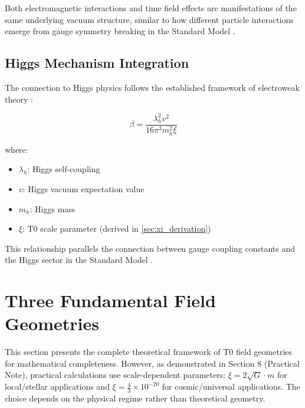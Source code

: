 \documentclass[12pt,a4paper]{article}
\begin{document}
	\begin{tcolorbox}[colback=blue!5!white,colframe=blue!75!black,title=Vacuum Structure Unity]
		Both electromagnetic interactions and time field effects are manifestations of the same underlying vacuum structure, similar to how different particle interactions emerge from gauge symmetry breaking in the Standard Model \citep{weinberg2003,peskin1995}.
	\end{tcolorbox}
	
	\subsection{Higgs Mechanism Integration}
	\label{subsec:higgs_mechanism}
	
	The connection to Higgs physics follows the established framework of electroweak theory \citep{higgs1964,englert1964,weinberg1967,salam1968}:
	
	\begin{equation}
		\label{eq:higgs_connection}
		\beta = \frac{\lambda_h^2 v^2}{16\pi^3 m_h^2 \xi}
	\end{equation}
	
	where:
	\begin{itemize}
		\item $\lambda_h$: Higgs self-coupling \citep{djouadi2008}
		\item $v$: Higgs vacuum expectation value \citep{weinberg2003}
		\item $m_h$: Higgs mass \citep{aad2012,chatrchyan2012}
		\item $\xi$: T0 scale parameter (derived in \cref{sec:xi_derivation})
	\end{itemize}
	
	This relationship parallels the connection between gauge coupling constants and the Higgs sector in the Standard Model \citep{peskin1995,weinberg2003}.
	
	\section{Three Fundamental Field Geometries}
	\label{sec:three_geometries}
	
	\begin{tcolorbox}[colback=orange!5!white,colframe=orange!75!black,title=Important Methodological Note]
		This section presents the complete theoretical framework of T0 field geometries for mathematical completeness. However, as demonstrated in Section 8 (Practical Note), practical calculations use scale-dependent parameters: $\xi = 2\sqrt{G} \cdot m$ for local/stellar applications and $\xi = \frac{4}{3} \times 10^{-20}$ for cosmic/universal applications. The choice depends on the physical regime rather than theoretical geometry.
	\end{tcolorbox}
	
\end{document}
